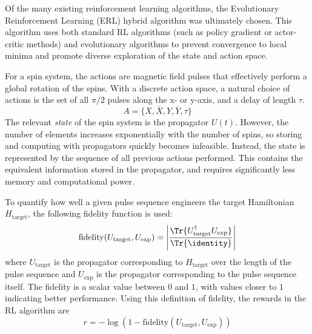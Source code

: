 \documentclass{article}
\begin{document}
Of the many existing reinforcement learning algorithms, the Evolutionary Reinforcement Learning (ERL) hybrid algorithm \cite{khadka2018evolutionguided} was ultimately chosen. This algorithm uses both standard RL algorithms (such as policy gradient or actor-critic methods) and evolutionary algorithms to prevent convergence to local minima and promote diverse exploration of the state and action space.

For a spin system, the actions are magnetic field pulses that effectively perform a global rotation of the spins.
With a discrete action space, a natural choice of actions is the set of all $\pi/2$ pulses along the x- or y-axis, and a delay of length $\tau$.
\begin{equation}
    A = \{ X, \overline{X}, Y, \overline{Y}, \tau \}
\end{equation}
The relevant \emph{state} of the spin system is the propagator $U(t)$. However, the number of elements increases exponentially with the number of spins, so storing and computing with propagators quickly becomes infeasible.
Instead, the state is represented by the sequence of all previous actions performed. This contains the equivalent information stored in the propagator, and requires significantly less memory and computational power.

To quantify how well a given pulse sequence engineers the target Hamiltonian $H_\text{target}$, the following fidelity function is used:
\begin{equation}\label{eq:fidelity}
    \text{fidelity}(U_\text{target}, U_\text{exp}) = \left|
        \frac{\Tr{U_\text{target}^\dagger U_\text{exp}}}%
        {\Tr{\identity}}
    \right|
\end{equation}
where $U_\text{target}$ is the propagator corresponding to $H_\text{target}$ over the length of the pulse sequence and $U_\text{exp}$ is the propagator corresponding to the pulse sequence itself. The fidelity is a scalar value between $0$ and $1$, with values closer to $1$ indicating better performance. Using this definition of fidelity, the rewards in the RL algorithm are
\begin{equation}\label{eq:rewards}
    r = -\log\left( 1- \text{fidelity}(U_\text{target}, U_\text{exp})
    \right)
\end{equation}
\end{document}
